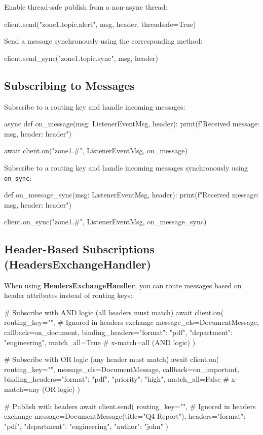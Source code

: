 Enable thread-safe publish from a non-async thread:
\begin{pythoncode}
client.send("zone1.topic.alert", msg, header, threadsafe=True)
\end{pythoncode}

Send a message synchronously using the corresponding method:
\begin{pythoncode}
client.send_sync("zone1.topic.sync", msg, header)
\end{pythoncode}


\subsection{Subscribing to Messages}
Subscribe to a routing key and handle incoming messages:
\begin{pythoncode}
async def on_message(msg: ListenerEventMsg, header):
    print(f"Received message: {msg}, header: {header}")

await client.on("zone1.#", ListenerEventMsg, on_message)
\end{pythoncode}


Subscribe to a routing key and handle incoming messages synchronously using \texttt{on\_sync}:
\begin{pythoncode}
def on_message_sync(msg: ListenerEventMsg, header):
    print(f"Received message: {msg}, header: {header}")

client.on_sync("zone1.#", ListenerEventMsg, on_message_sync)
\end{pythoncode}

\subsection{Header-Based Subscriptions (HeadersExchangeHandler)}
When using \textbf{HeadersExchangeHandler}, you can route messages based on header attributes instead of routing keys:

\begin{pythoncode}
# Subscribe with AND logic (all headers must match)
await client.on(
    routing_key="",  # Ignored in headers exchange
    message_cls=DocumentMessage,
    callback=on_document,
    binding_headers={"format": "pdf", "department": "engineering"},
    match_all=True  # x-match=all (AND logic)
)

# Subscribe with OR logic (any header must match)
await client.on(
    routing_key="",
    message_cls=DocumentMessage,
    callback=on_important,
    binding_headers={"format": "pdf", "priority": "high"},
    match_all=False  # x-match=any (OR logic)
)

# Publish with headers
await client.send(
    routing_key="",  # Ignored in headers exchange
    message=DocumentMessage(title="Q4 Report"),
    headers={"format": "pdf", "department": "engineering", "author": "john"}
)
\end{pythoncode}

